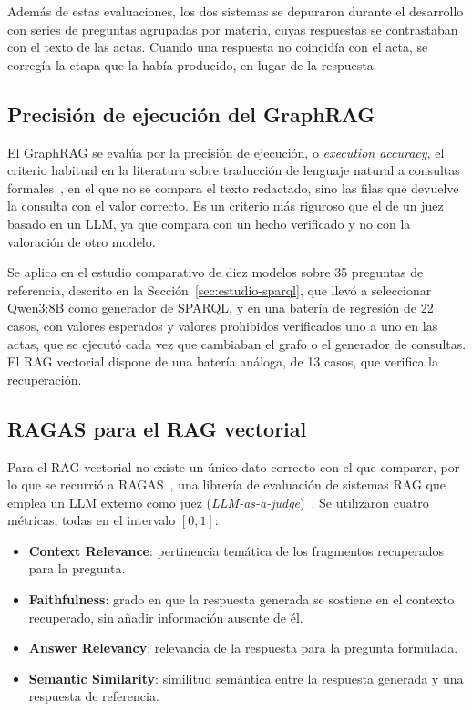 \documentclass[11pt, a4paper]{report}
\begin{document}
	Además de estas evaluaciones, los dos sistemas se depuraron durante el
	desarrollo con series de preguntas agrupadas por materia, cuyas respuestas se
	contrastaban con el texto de las actas. Cuando una respuesta no coincidía con
	el acta, se corregía la etapa que la había producido, en lugar de la respuesta.

	\subsection{Precisión de ejecución del GraphRAG}

	El GraphRAG se evalúa por la precisión de ejecución, o \textit{execution
	accuracy}, el criterio habitual en la literatura sobre traducción de
	lenguaje natural a consultas
	formales~\cite{gao2024-dailsql}, en el que no se compara
	el texto redactado, sino las filas que devuelve la consulta con el valor
	correcto. Es un criterio más riguroso que el de un juez basado en un LLM, ya que compara con un hecho verificado y no con la valoración de otro modelo.

	Se aplica en el estudio comparativo de diez
	modelos sobre 35 preguntas de referencia, descrito en la
	Sección~\ref{sec:estudio-sparql}, que llevó a seleccionar Qwen3:8B como
	generador de SPARQL, y en una batería de regresión de 22 casos, con
	valores esperados y valores prohibidos verificados uno a uno en las actas, que
	se ejecutó cada vez que cambiaban el grafo o el generador de consultas. El RAG
	vectorial dispone de una batería análoga, de 13 casos, que verifica la
	recuperación.

	\subsection{RAGAS para el RAG vectorial}

	Para el RAG vectorial no existe un único dato correcto con el que comparar,
	por lo que se recurrió a RAGAS~\cite{ragas-library}, una librería de
	evaluación de sistemas RAG que emplea un LLM externo como juez (\textit{LLM-as-a-judge})~\cite{zheng2023-llm-judge}. Se
	utilizaron cuatro métricas, todas en el intervalo $[0,1]$:

	\begin{itemize}
		\item \textbf{Context Relevance}: pertinencia temática de los fragmentos
		recuperados para la pregunta.
		\item \textbf{Faithfulness}: grado en que la respuesta generada se
		sostiene en el contexto recuperado, sin añadir información ausente de él.
		\item \textbf{Answer Relevancy}: relevancia de la respuesta para la
		pregunta formulada.
		\item \textbf{Semantic Similarity}: similitud semántica entre la respuesta
		generada y una respuesta de referencia.
	\end{itemize}
\end{document}
